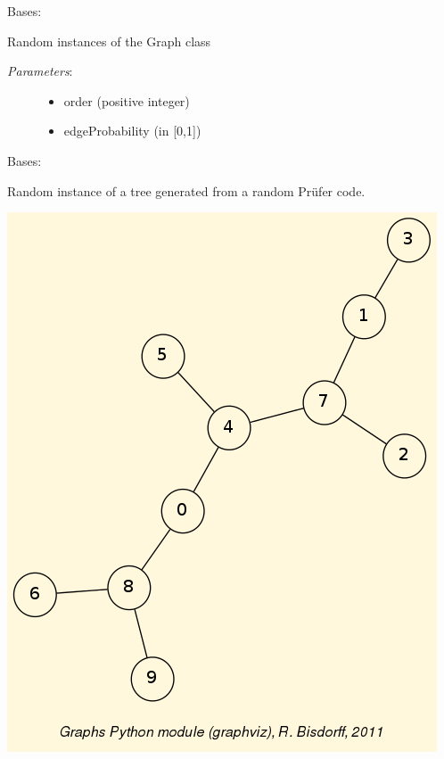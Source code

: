 \documentclass[letterpaper,10pt,english]{sphinxmanual}
\begin{document}

\begin{fulllineitems}
\label{techDoc:graphs.RandomGraph}
Bases: {\hyperref[techDoc:graphs.Graph]{}}

Random instances of the Graph class
\begin{description}
\item[{\emph{Parameters}:}] \leavevmode\begin{itemize}
\item {} 
order (positive integer)

\item {} 
edgeProbability (in {[}0,1{]})

\end{itemize}

\end{description}

\end{fulllineitems}


\begin{fulllineitems}
\label{techDoc:graphs.RandomTree}
Bases: {\hyperref[techDoc:graphs.Graph]{}}

Random instance of a tree generated from a random Prüfer code.

\includegraphics{randomTree.png}

\end{fulllineitems}
\end{document}
